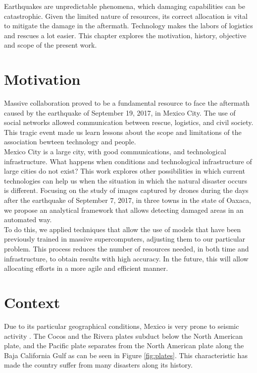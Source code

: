 Earthquakes are unpredictable phenomena, which damaging capabilities can be catastrophic. Given the limited nature of resources, its correct allocation is vital to mitigate the damage in the aftermath. Technology makes the labors of logistics and rescues a lot easier. This chapter explores the motivation, history, objective and scope of the present work.\\

\section{Motivation}

Massive collaboration proved to be a fundamental resource to face the aftermath caused by the earthquake of September 19, 2017, in Mexico City. The use of social networks allowed communication between rescue, logistics, and civil society. This tragic event made us learn lessons about the scope and limitations of the association bewteen technology and people.\\

Mexico City is a large city, with good communications, and technological infrastructure. What happens when conditions and technological infrastructure of large cities do not exist? This work explores other possibilities in which current technologies can help us when the situation in which the natural disaster occurs is different. Focusing on the study of images captured by drones during the days after the earthquake of September 7, 2017, in three towns in the state of Oaxaca, we propose an analytical framework that allows detecting damaged areas in an automated way.\\

To do this, we applied techniques that allow the use of models that have been previously trained in massive supercomputers, adjusting them to our particular problem. This process reduces the number of resources needed, in both time and infrastructure, to obtain results with high accuracy. In the future, this will allow allocating efforts in a more agile and efficient manner.\\

\section{Context}

Due to its particular geographical conditions, Mexico is very prone to seismic activity \cite{AG3315}. The Cocos and the Rivera plates subduct below the North American plate, and the Pacific plate separates from the North American plate along the Baja California Gulf as can be seen in Figure \ref{fig:plates}. This characteristic has made the country suffer from many disasters along its history.\\

